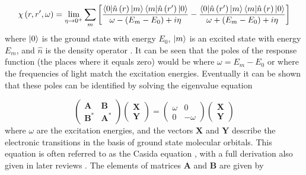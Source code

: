 \begin{equation}
    \chi\left(r, r^\prime, \omega \right) = \lim_{\eta \to 0^+} \sum_m \left[ \frac{\braket{0|\hat{n}\left(r\right)|m}\braket{m|\hat{n}\left(r^\prime\right)|0}}{\omega - \left(E_m - E_0\right) + i\eta} - \frac{\braket{0|\hat{n}\left(r^\prime\right)|m}\braket{m|\hat{n}\left(r\right)|0}}{\omega + \left(E_m - E_0\right) + i\eta} \right]
\end{equation}
%
where $\ket{0}$ is the ground state with energy $E_0$, $\ket{m}$ is an excited state
with energy $E_m$, and $\hat{n}$ is the density operator \cite{Petersilka1996}. 
It can be seen that the poles of the response function (the places where it equals zero)
would be where $\omega = E_m - E_0$ or where the frequencies of light match the 
excitation energies. Eventually it can be shown that these poles can be identified
by solving the eigenvalue equation

\begin{equation}
\label{eq:full_cassida_eq1}
\left(\begin{matrix}
\mathbf{A} & \mathbf{B} \\
\mathbf{B^*} & \mathbf{A^*}
\end{matrix}\right)
\left(\begin{matrix}
\mathbf{X}\\
\mathbf{Y}
\end{matrix}\right)
=
\left(\begin{matrix}
\omega & 0\\
0 & -\omega
\end{matrix}\right)
\left(\begin{matrix}
\mathbf{X}\\
\mathbf{Y}
\end{matrix}\right)
\end{equation}
%
where $\omega$ are the excitation energies, and the vectors $\mathbf{X}$ and $\mathbf{Y}$ 
describe the electronic transitions in the basis of ground state molecular orbitals.
This equation is often referred to as the Casida equation \cite{Casida1995}, with 
a full derivation also given in later reviews \cite{Casida2004, Marques2012}. The
elements of matrices $\mathbf{A}$ and $\mathbf{B}$ are given by

